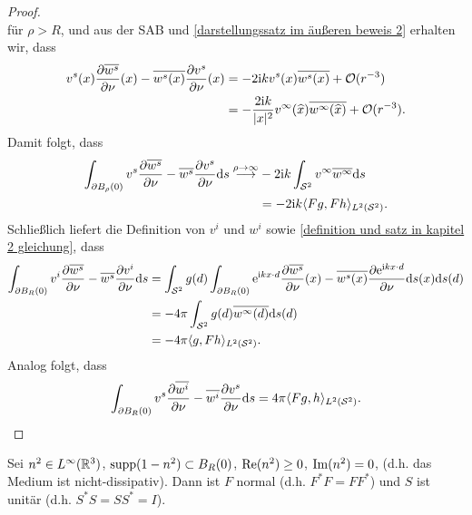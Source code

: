 \begin{proof}
\begin{equation*}
	\end{equation*}
	für \(\rho>R\), und aus der SAB und \eqref{darstellungssatz im äußeren beweis 2} erhalten wir, dass
	\begin{align*}
		v^s(x)\frac{\partial \overline{w^s}}{\partial\nu}(x)-\overline{w^s(x)}\frac{\partial v^s}{\partial\nu}(x)
		&=-2\mathrm{i} kv^s(x)\overline{w^s(x)}+\mathcal{O}(r^{-3})\\
		&=-\frac{2\mathrm{i} k}{|x|^2}v^\infty(\widehat{x})\overline{w^\infty(\widehat{x})}+\mathcal{O}(r^{-3}).
	\end{align*}
	Damit folgt, dass
	\begin{align*}
		\int_{\partial B_\rho(0)}v^s\frac{\partial\overline{w^s}}{\partial\nu}-\overline{w^s}\frac{\partial v^s}{\partial\nu}\mathrm{d}s\overset{\rho\to\infty}{\longrightarrow}
		&-2\mathrm{i} k\int_{\mathcal{S}^2}v^\infty\overline{w^\infty}\mathrm{d}s\\
		&=-2\mathrm{i} k\langle Fg, Fh\rangle_{L^2(\mathcal{S}^2)}.
	\end{align*}
	Schließlich liefert die Definition von \(v^i\) und \(w^i\) sowie \eqref{definition und satz in kapitel 2 gleichung}, dass
	\begin{align*}
		\int_{\partial B_R(0)}v^i\frac{\partial \overline{w^s}}{\partial\nu}-\overline{w^s}\frac{\partial v^i}{\partial\nu}\mathrm{d}s
		&=\int_{\mathcal{S}^2}g(d)\int_{\partial B_R(0)}\mathrm{e}^{\mathrm{i} kx\cdot d}\frac{\partial \overline{w^s}}{\partial\nu}(x)-\overline{w^s(x)}\frac{\partial \mathrm{e}^{\mathrm{i} kx\cdot d}}{\partial\nu}\mathrm{d}s(x)\mathrm{d}s(d)\\
		&=-4\pi\int_{\mathcal{S}^2}g(d)\overline{w^\infty(d)}\mathrm{d}s(d)\\
		&=-4\pi\langle g, Fh\rangle_{L^2(\mathcal{S}^2)}.
	\end{align*}
	Analog folgt, dass
	\begin{equation*}
		\int_{\partial B_R(0)}v^s\frac{\partial \overline{w^i}}{\partial\nu}-\overline{w^i}\frac{\partial v^s}{\partial\nu}\mathrm{d}s=4\pi\langle Fg, h\rangle_{L^2(\mathcal{S}^2)}.
	\end{equation*}
\end{proof}
\begin{satz}\label{satz: F ist normal und S unitär}
	Sei \(n^2\in L^\infty(\mathbb{R}^3)\), \(\operatorname{supp}(1-n^2)\subset B_R(0)\), \(\operatorname{Re}(n^2)\geq0\), \(\operatorname{Im}(n^2)=0\), (d.h. das Medium ist nicht-dissipativ). Dann ist \(F\) normal (d.h. \(F^\ast F=FF^\ast\)) und \(S\) ist unitär (d.h. \(S^\ast S=SS^\ast=I\)).
\end{satz}

